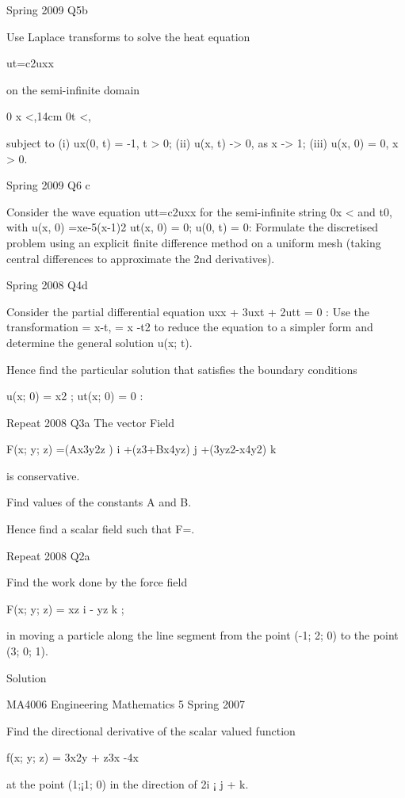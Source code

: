 Spring 2009 Q5b
 
Use Laplace transforms to solve the heat equation

            ut=c2uxx
 
on the semi-infinite domain
 
         0 x <,14cm  0t <,
 
subject to
(i) ux(0, t) = -1, t > 0;
(ii) u(x, t) -> 0, as x -> 1;
(iii) u(x, 0) = 0, x > 0.


 

 
Spring 2009 Q6 c
 
Consider the wave equation utt=c2uxx for the semi-infinite string
0x < and t0, with
u(x, 0) =xe-5(x-1)2
ut(x, 0) = 0; u(0, t) = 0:
Formulate the discretised problem using an explicit finite difference method on a uniform mesh (taking central differences to approximate the 2nd derivatives).

 
Spring 2008 Q4d
 
Consider the partial differential equation
                uxx + 3uxt + 2utt = 0 :
Use the transformation = x-t, = x -t2 to reduce the equation to a simpler form and determine the general solution u(x; t).

Hence find the particular solution that satisfies the boundary conditions    

u(x; 0) = x2 ; ut(x; 0) = 0 :


Repeat 2008 Q3a
The vector Field
 
F(x; y; z) =(Ax3y2z ) i +(z3+Bx4yz) j +(3yz2-x4y2) k
 
is conservative.
 
Find values of the constants A and B.
 
Hence find a scalar field  such that F=.



Repeat 2008 Q2a
 
Find the work done by the force field

        F(x; y; z) = xz i - yz k ;

in moving a particle along the line segment from the point (-1; 2; 0) to the point (3; 0; 1).

Solution

 

MA4006 Engineering Mathematics 5 Spring 2007
 
Find the directional derivative of the scalar valued function

f(x; y; z) = 3x2y + z3x -4x
 
at the point (1;¡1; 0) in the direction of 2i ¡ j + k.
